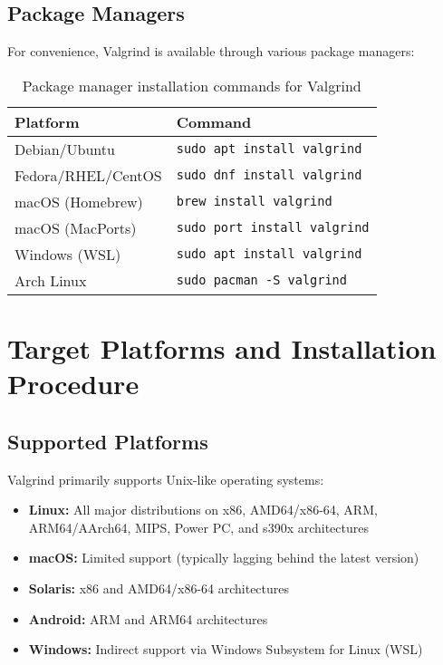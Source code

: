 \documentclass[11pt,a4paper]{article}
\begin{document}
\subsection{Package Managers}
For convenience, Valgrind is available through various package managers:

\begin{table}[h]
\centering
\begin{tabular}{ll}
\toprule
\textbf{Platform} & \textbf{Command} \\
\midrule
Debian/Ubuntu & \texttt{sudo apt install valgrind} \\
Fedora/RHEL/CentOS & \texttt{sudo dnf install valgrind} \\
macOS (Homebrew) & \texttt{brew install valgrind} \\
macOS (MacPorts) & \texttt{sudo port install valgrind} \\
Windows (WSL) & \texttt{sudo apt install valgrind} \\
Arch Linux & \texttt{sudo pacman -S valgrind} \\
\bottomrule
\end{tabular}
\caption{Package manager installation commands for Valgrind}
\end{table}

\section{Target Platforms and Installation Procedure}

\subsection{Supported Platforms}
Valgrind primarily supports Unix-like operating systems:

\begin{itemize}
    \item \textbf{Linux:} All major distributions on x86, AMD64/x86-64, ARM, ARM64/AArch64, MIPS, Power PC, and s390x architectures
    \item \textbf{macOS:} Limited support (typically lagging behind the latest version)
    \item \textbf{Solaris:} x86 and AMD64/x86-64 architectures
    \item \textbf{Android:} ARM and ARM64 architectures
    \item \textbf{Windows:} Indirect support via Windows Subsystem for Linux (WSL)
\end{itemize}
\end{document}
